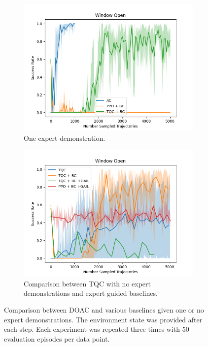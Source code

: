 \begin{figure}[htbp]
\begin{subfigure}[t]{0.45\textwidth}
    \includegraphics[width=\textwidth]{images/dense_1/Window Open.png}
    \caption{One expert demonstration.}
  \end{subfigure}
  \hfill
  \begin{subfigure}[t]{0.45\textwidth}
    \includegraphics[width=\textwidth]{images/TQC_bc_GAIL_vs_ref/Window Open.png}
    \caption{Comparison between TQC with no expert demonstrations and expert guided baselines.}
    \label{fig:TQC_0_vs_exp}
  \end{subfigure}
  \caption{Comparison between DOAC and various baselines given one or no expert demonstrations. The environment state was provided after each step.
  Each experiment was repeated three times with 50 evaluation episodes per data point.}
  \label{fig:dense_ref}
\end{figure}

